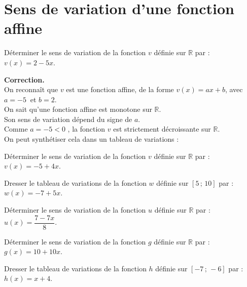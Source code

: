 \documentclass[11pt]{article}
\begin{document}
\phantom{0}
\vspace{-1cm}
\section{Sens de variation d'une fonction affine}

\vspace{-.5cm}
\begin{exercice}
 Déterminer le sens de variation de la fonction $v$ définie sur
 $\mathbb R$ par : $v(x)=2-5x$.
 \begin{multicols}{2}
   \textbf{Correction.} \\
   On reconnaît que $v$ est une fonction affine, de la forme $v(x)=ax+b$, avec $a=-5~$ et $b=2$. \\
   On sait qu'une fonction affine est monotone sur $\mathbb{R}$.\\
   Son sens de variation dépend du signe de $a$.\\Comme $a=-5<0$ , la
   fonction $v$ est strictement décroissante sur $\mathbb{R}$.\\On
   peut synthétiser cela dans un tableau de
   variations :
   
   \begin{center}
   \end{center}
 \end{multicols}
\end{exercice}

\vspace{-.5cm}
\begin{exercice}
\begin{enu}
	\item Déterminer le sens de variation de la fonction $v$ définie sur $\mathbb R$ par : $v(x)=-5+4x$.
	\item Dresser le tableau de variations de la fonction $w$ définie sur $[5\,;\,10]$ par : $w(x)=-7+5x$.
	\item Déterminer le sens de variation de la fonction $u$ définie sur $\mathbb R$ par : $u(x)=\dfrac{7-7x}{8}$.
	\item Déterminer le sens de variation de la fonction $g$ définie sur $\mathbb R$ par : $g(x)=10+10x$.
	\item Dresser le tableau de variations de la fonction $h$ définie sur $[-7\,;\,-6]$ par : $h(x)=x+4$.
\end{enu}
\end{exercice}
\end{document}
